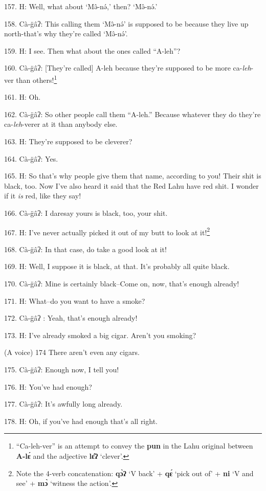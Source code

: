 157. H: Well, what about `Mə̂-nə́,' then? `Mə̂-nə́.'

158. Cà-g̈âʔ: This calling them `Mə̂-nə́' is supposed to be because they
live up north-that's why they're called `Mə̂-nə́'.

159. H: I see. Then what about the ones called ``A-leh''?

160. Cà-g̈âʔ: [They're called] A-leh because they're supposed to be more ca-\textit{leh}-ver
than others!\footnote{``Ca-leh-ver'' is an attempt to convey the \textbf{pun} in the Lahu original between \textbf{A-lɛ́} and the adjective \textbf{lɛ̂ʔ} `clever'.}

161. H: Oh.

162. Cà-g̈âʔ: So other people call them ``A-leh.'' Because
whatever they do they're ca-\textit{leh}-verer at it than anybody else.

163. H: They're supposed to be cleverer?

164. Cà-g̈âʔ: Yes.

165. H: So that's why people give them that name, according to you! Their shit is
black, too. Now I've also heard it said that the Red Lahu have red shit. I wonder
if it \textit{is} red, like they say!

166. Cà-g̈âʔ: I daresay yours is black, too, your shit.

167. H: I've never actually picked it out of my butt to look at it!\footnote{Note the 4-verb concatenation: \textbf{qɔ̀ʔ} `V back' + \textbf{qɛ́} `pick out of' + \textbf{ni} `V and see' + \textbf{mɔ̀} `witness the action'.}

\begin{center}
\end{center}

168. Cà-g̈âʔ: In that case, do take a good look at it!

169. H: Well, I suppose it is black, at that. It's probably all quite black.

170. Cà-g̈âʔ: Mine is certainly black--Come on, now, that's enough already!

171. H: What--do you want to have a smoke?

172. Cà-g̈âʔ : Yeah, that's enough already!

173. H: I've already smoked a big cigar. Aren't you smoking?

(A voice) 174 There aren't even any cigars.

175. Cà-g̈âʔ: Enough now, I tell you!

176. H: You've had enough?

177. Cà-g̈âʔ: It's awfully long already.

178. H: Oh, if you've had enough that's all right.

